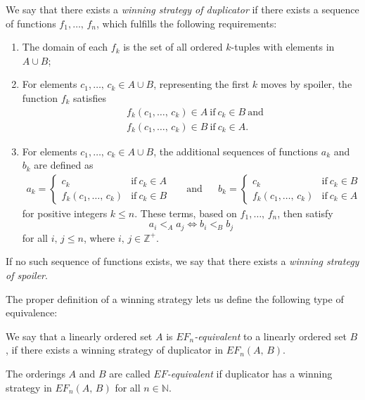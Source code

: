 \documentclass[../../main.tex]{subfiles}
\begin{document}
\begin{definition}
    We say that there exists a \textit{winning strategy of duplicator} if there exists a sequence of functions $f_1,\ldots,\,f_n$,
    which fulfills the following requirements:
    \begin{enumerate}[label=(\roman*)]
        \item The domain of each $f_k$ is the set of all ordered $k$-tuples with elements in $A \cup B$;
        \item For elements $c_1,\ldots,\, c_k \in A \cup B$, representing the first $k$ moves by spoiler, 
        the function $f_k$ satisfies
              \begin{align*}
                    &f_k(c_1,\ldots,\, c_k) \in A \ \text{if} \ c_k \in B \ \text{and}\\
                    &f_k(c_1,\ldots,\, c_k) \in B \ \text{if} \ c_k \in A.
              \end{align*}
        \item For elements $c_1,\ldots,\, c_k \in A \cup B$, the additional sequences of functions $a_k$ and $b_k$ are defined as
              \begin{align*}
                a_k = \begin{cases}
                        c_k \ &\text{if} \ c_k \in A \\
                        f_k(c_1,\ldots,\, c_k) &\text{if} \ c_k \in B
                    \end{cases} 
                    && \text{and} &&
                    b_k = \begin{cases}
                        c_k \ &\text{if} \ c_k \in B \\
                        f_k(c_1,\ldots,\, c_k) &\text{if} \ c_k \in A
                    \end{cases}
              \end{align*}
              for positive integers $k \leq n$.
              These terms, based on $f_1,\ldots,\,f_n$, then satisfy $$a_i <_A a_j \iff b_i <_B b_j$$ for all $i,\, j \leq n$, where $i,\, j \in \mathbb{Z}^+$.
    \end{enumerate}
    If no such sequence of functions exists, we say that there exists a \textit{winning strategy of spoiler}.
\end{definition}

The proper definition of a winning strategy lets us define the following type of equivalence:
\begin{definition}[$EF_n$-equivalence]\cite[Definition 6.8]{Ros82}
    We say that a linearly ordered set $A$ is \emph{$EF_n$-equivalent} to a linearly ordered set $B$,
    if there exists a winning strategy of duplicator in $EF_n(A,\, B)$.

    The orderings $A$ and $B$ are called \emph{$EF$-equivalent} if duplicator has a winning strategy in $EF_n(A,\, B)$ for all $n \in \mathbb{N}$.
\end{definition}
\end{document}
